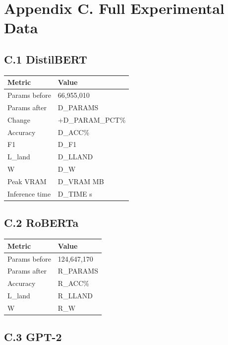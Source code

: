 \section{Appendix C. Full Experimental Data}

\subsection{C.1 DistilBERT}

\begin{table}[H]
\centering
\small
\begin{tabular}{ll}
\toprule
\textbf{Metric} & \textbf{Value} \\
\midrule
Params before & 66,955,010 \\
Params after & {{D\_PARAMS}} \\
Change & +{{D\_PARAM\_PCT}}\% \\
Accuracy & {{D\_ACC}}\% \\
F1 & {{D\_F1}} \\
L\_land & {{D\_LLAND}} \\
W & {{D\_W}} \\
Peak VRAM & {{D\_VRAM}} MB \\
Inference time & {{D\_TIME}} s \\
\bottomrule
\end{tabular}
\end{table}

\subsection{C.2 RoBERTa}

\begin{table}[H]
\centering
\small
\begin{tabular}{ll}
\toprule
\textbf{Metric} & \textbf{Value} \\
\midrule
Params before & 124,647,170 \\
Params after & {{R\_PARAMS}} \\
Accuracy & {{R\_ACC}}\% \\
L\_land & {{R\_LLAND}} \\
W & {{R\_W}} \\
\bottomrule
\end{tabular}
\end{table}

\subsection{C.3 GPT-2}

